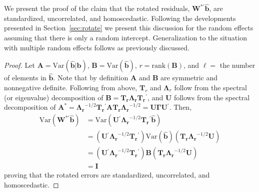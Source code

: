 \documentclass[12pt]{article} %
\newcommand{\al}[1]{{\color{red} #1}}
\newcommand{\trans}{\ensuremath{^\prime}}
\newcommand{\var}{\ensuremath{\mathrm{Var}}}
\begin{document}
\al{
We present the proof of the claim that the rotated residuals, $\bm{W}^{*\prime} \widehat{\bm{b}}$, are standardized, uncorrelated, and homoscedastic. Following the developments presented in Section~\ref{sec:rotate} we present this discussion for the random effects assuming that there is only a random intercept. Generalization to the situation with multiple random effects follows as previously discussed.
}

\begin{proof}
 Let $\bm{A} = \var(\widehat{\bm{b}} | \bm{b})$, $\bm{B} = \var(\widehat{\bm{b}})$, $r = \text{rank}(\bm{B})$, and $\ell = $ the number of elements in $\widehat{\bm{b}}$. Note that by definition $\bm{A}$ and $\bm{B}$ are symmetric and nonnegative definite. Following from above, $\bm{T}_r$ and $\bm{\Lambda}_r$ follow from the spectral (or eigenvalue) decomposition of $\bm{B} = \bm{T_r \Lambda_r T_r}\trans$, and $\bm{U}$ follows from the spectral decomposition of $\bm{A^*} = \bm{\Lambda_r}^{-1/2} \bm{T_r}\trans \bm{A T_r \Lambda_r}^{-1/2} = \bm{U} \bm{\Gamma} \bm{U}\trans$. Then, 
\begin{align*}
\var(\bm{W}^{*\prime} \widehat{\bm{b}}) &= \var(\bm{U}\trans \bm{\Lambda_r}^{-1/2} \bm{T_r}\trans \widehat{\bm{b}})\\
&= (\bm{U}\trans \bm{\Lambda_r}^{-1/2} \bm{T_r}\trans) \var(\widehat{\bm{b}}) (\bm{T_r \Lambda_r}^{-1/2} \bm{U})\\
&= (\bm{U}\trans \bm{\Lambda_r}^{-1/2} \bm{T_r}\trans) \bm{B} (\bm{T_r \Lambda_r}^{-1/2} \bm{U})\\
&= \bm{I}
\end{align*}
proving that the rotated errors are standardized, uncorrelated, and homoscedastic.
\end{proof}
 
\end{document}
